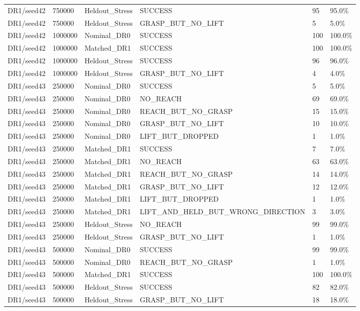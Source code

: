\documentclass[11pt,a4paper,oneside]{book}
\begin{document}
\begin{longtable}{l l l l l l}
DR1/seed42 & 750000 & Heldout\_Stress & SUCCESS & 95 & 95.0\% \\
DR1/seed42 & 750000 & Heldout\_Stress & GRASP\_BUT\_NO\_LIFT & 5 & 5.0\% \\
DR1/seed42 & 1000000 & Nominal\_DR0 & SUCCESS & 100 & 100.0\% \\
DR1/seed42 & 1000000 & Matched\_DR1 & SUCCESS & 100 & 100.0\% \\
DR1/seed42 & 1000000 & Heldout\_Stress & SUCCESS & 96 & 96.0\% \\
DR1/seed42 & 1000000 & Heldout\_Stress & GRASP\_BUT\_NO\_LIFT & 4 & 4.0\% \\
DR1/seed43 & 250000 & Nominal\_DR0 & SUCCESS & 5 & 5.0\% \\
DR1/seed43 & 250000 & Nominal\_DR0 & NO\_REACH & 69 & 69.0\% \\
DR1/seed43 & 250000 & Nominal\_DR0 & REACH\_BUT\_NO\_GRASP & 15 & 15.0\% \\
DR1/seed43 & 250000 & Nominal\_DR0 & GRASP\_BUT\_NO\_LIFT & 10 & 10.0\% \\
DR1/seed43 & 250000 & Nominal\_DR0 & LIFT\_BUT\_DROPPED & 1 & 1.0\% \\
DR1/seed43 & 250000 & Matched\_DR1 & SUCCESS & 7 & 7.0\% \\
DR1/seed43 & 250000 & Matched\_DR1 & NO\_REACH & 63 & 63.0\% \\
DR1/seed43 & 250000 & Matched\_DR1 & REACH\_BUT\_NO\_GRASP & 14 & 14.0\% \\
DR1/seed43 & 250000 & Matched\_DR1 & GRASP\_BUT\_NO\_LIFT & 12 & 12.0\% \\
DR1/seed43 & 250000 & Matched\_DR1 & LIFT\_BUT\_DROPPED & 1 & 1.0\% \\
DR1/seed43 & 250000 & Matched\_DR1 & LIFT\_AND\_HELD\_BUT\_WRONG\_DIRECTION & 3 & 3.0\% \\
DR1/seed43 & 250000 & Heldout\_Stress & NO\_REACH & 99 & 99.0\% \\
DR1/seed43 & 250000 & Heldout\_Stress & GRASP\_BUT\_NO\_LIFT & 1 & 1.0\% \\
DR1/seed43 & 500000 & Nominal\_DR0 & SUCCESS & 99 & 99.0\% \\
DR1/seed43 & 500000 & Nominal\_DR0 & REACH\_BUT\_NO\_GRASP & 1 & 1.0\% \\
DR1/seed43 & 500000 & Matched\_DR1 & SUCCESS & 100 & 100.0\% \\
DR1/seed43 & 500000 & Heldout\_Stress & SUCCESS & 82 & 82.0\% \\
DR1/seed43 & 500000 & Heldout\_Stress & GRASP\_BUT\_NO\_LIFT & 18 & 18.0\% \\

\end{longtable}
\end{document}
